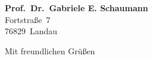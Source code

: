 \documentclass[10pt,a4paper]{scrlttr2}
\begin{document}
\begin{letter}{%
    \textbf{Prof.\ Dr.\ Gabriele E. Schaumann}\\
    Fortstraße~7\\
    76829~Landau
  }

  \opening{}

  \lipsum[3-5]

  \clearpage

  \lipsum[3-8]

  \closing{Mit freundlichen Grüßen}
  
\end{letter}

\end{document}
